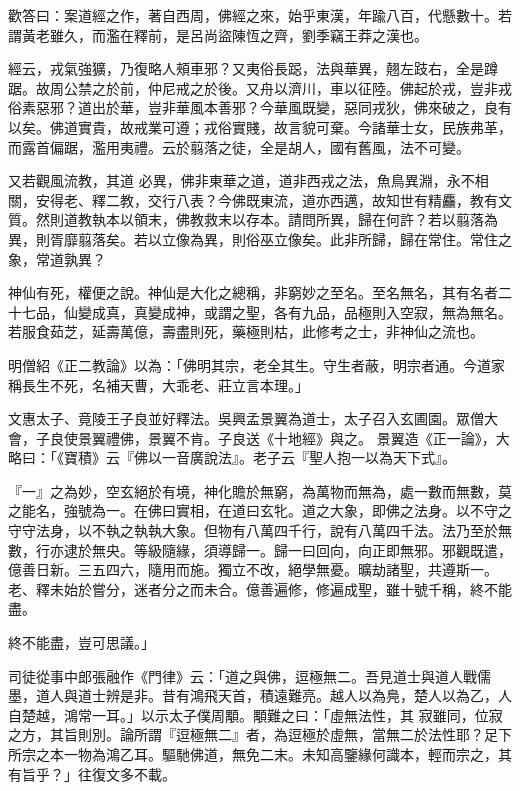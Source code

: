\begin{pinyinscope}
 歡答曰：案道經之作，著自西周，佛經之來，始乎東漢，年踰八百，代懸數十。若謂黃老雖久，而濫在釋前，是呂尚盜陳恆之齊，劉季竊王莽之漢也。



 經云，戎氣強獷，乃復略人頰車邪？又夷俗長跽，法與華異，翹左跂右，全是蹲踞。故周公禁之於前，仲尼戒之於後。又舟以濟川，車以征陸。佛起於戎，豈非戎俗素惡邪？道出於華，豈非華風本善邪？今華風既變，惡同戎狄，佛來破之，良有以矣。佛道實貴，故戒業可遵；戎俗實賤，故言貌可棄。今諸華士女，民族弗革，而露首偏踞，濫用夷禮。云於翦落之徒，全是胡人，國有舊風，法不可變。



 又若觀風流教，其道
 必異，佛非東華之道，道非西戎之法，魚鳥異淵，永不相關，安得老、釋二教，交行八表？今佛既東流，道亦西邁，故知世有精麤，教有文質。然則道教執本以領末，佛教救末以存本。請問所異，歸在何許？若以翦落為異，則胥靡翦落矣。若以立像為異，則俗巫立像矣。此非所歸，歸在常住。常住之象，常道孰異？



 神仙有死，權便之說。神仙是大化之總稱，非窮妙之至名。至名無名，其有名者二十七品，仙變成真，真變成神，或謂之聖，各有九品，品極則入空寂，無為無名。若服食茹芝，延壽萬億，壽盡則死，藥極則枯，此修考之士，非神仙之流也。



 明僧紹《正二教論》以為：「佛明其宗，老全其生。守生者蔽，明宗者通。今道家稱長生不死，名補天曹，大乖老、莊立言本理。」



 文惠太子、竟陵王子良並好釋法。吳興孟景翼為道士，太子召入玄圃園。眾僧大會，子良使景翼禮佛，景翼不肯。子良送《十地經》與之。
 景翼造《正一論》，大略曰：「《寶積》云『佛以一音廣說法』。老子云『聖人抱一以為天下式』。



 『一』之為妙，空玄絕於有境，神化贍於無窮，為萬物而無為，處一數而無數，莫之能名，強號為一。在佛曰實相，在道曰玄牝。道之大象，即佛之法身。以不守之守守法身，以不執之執執大象。但物有八萬四千行，說有八萬四千法。法乃至於無數，行亦逮於無央。等級隨緣，須導歸一。歸一曰回向，向正即無邪。邪觀既遣，億善日新。三五四六，隨用而施。獨立不改，絕學無憂。曠劫諸聖，共遵斯一。老、釋未始於嘗分，迷者分之而未合。億善遍修，修遍成聖，雖十號千稱，終不能盡。



 終不能盡，豈可思議。」



 司徒從事中郎張融作《門律》云：「道之與佛，逗極無二。吾見道士與道人戰儒墨，道人與道士辨是非。昔有鴻飛天首，積遠難亮。越人以為鳧，楚人以為乙，人自楚越，鴻常一耳。」以示太子僕周顒。顒難之曰：「虛無法性，其
 寂雖同，位寂之方，其旨則別。論所謂『逗極無二』者，為逗極於虛無，當無二於法性耶？足下所宗之本一物為鴻乙耳。驅馳佛道，無免二末。未知高鑒緣何識本，輕而宗之，其有旨乎？」往復文多不載。




\end{pinyinscope}
